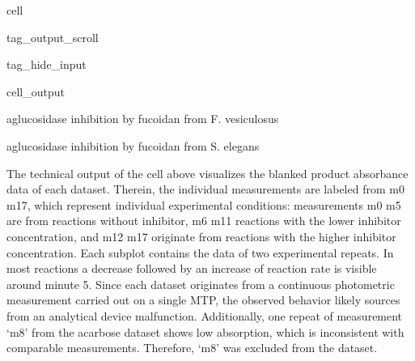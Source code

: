 \documentclass[letterpaper,12pt,english]{jupyterBook}
\begin{document}
\begin{sphinxuseclass}{cell}
\begin{sphinxuseclass}{tag_output_scroll}
\begin{sphinxuseclass}{tag_hide_input}
\begin{sphinxVerbatimOutput}
\begin{sphinxuseclass}{cell_output}
\noindent{}

\begin{sphinxVerbatim}[commandchars=\\\{\}]
a\PYGZhy{}glucosidase inhibition by fucoidan from F. vesiculosus
\end{sphinxVerbatim}

\noindent{}

\begin{sphinxVerbatim}[commandchars=\\\{\}]
a\PYGZhy{}glucosidase inhibition by fucoidan from S. elegans
\end{sphinxVerbatim}

\noindent{}

\end{sphinxuseclass}\end{sphinxVerbatimOutput}

\end{sphinxuseclass}
\end{sphinxuseclass}
\end{sphinxuseclass}
\sphinxAtStartPar
The technical output of the cell above visualizes the blanked product absorbance data of each dataset. Therein, the individual measurements are labeled from m0 \sphinxhyphen{} m17, which represent individual experimental conditions: measurements m0 \sphinxhyphen{} m5 are from reactions without inhibitor, m6 \sphinxhyphen{} m11 reactions with the lower inhibitor concentration, and m12 \sphinxhyphen{} m17 originate from reactions with the higher inhibitor concentration. Each subplot contains the data of two experimental repeats. In most reactions a decrease followed by an increase of reaction rate is visible around minute 5. Since each dataset originates from a continuous photometric measurement carried out on a single MTP, the observed behavior likely sources from an analytical device malfunction. Additionally, one repeat of measurement ‘m8’ from the acarbose dataset shows low absorption, which is inconsistent with comparable measurements. Therefore, ‘m8’ was excluded from the dataset.
\end{document}
